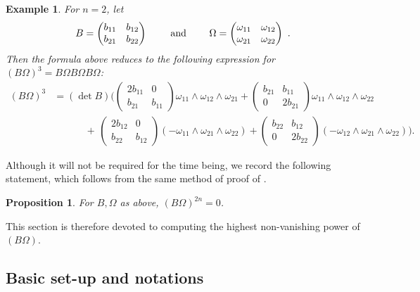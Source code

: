 \documentclass[10pt]{amsart}
\theoremstyle{plain}
\newtheorem{prop}[thm]{Proposition}
\newtheorem{ex}[thm]{Example}
\newcommand{\0}{\color{blue}{\mathsf{0}}}
\begin{document}
\begin{ex}  \label{ex:Bomeganis2} For $n=2$, let 
\[ B  = \begin{pmatrix} b_{11} & b_{12} \\ b_{21} & b_{22} \end{pmatrix} 
\qquad \hbox{ and } \qquad   \Omega=   \begin{pmatrix} \omega_{11} & \omega_{12} \\ \omega_{21} & \omega_{22} \end{pmatrix} \ . \] 
Then the formula above reduces to  the following expression for $(B\Omega)^3 = B \Omega B \Omega B \Omega$:
 \begin{align*}
(B\Omega)^3 &= (\det B) \Bigg(\left(\begin{array}{cc}2b_{11}&0\\b_{21}&b_{11}\end{array}\right)
\omega_{11}\wedge\omega_{12}\wedge\omega_{21}
+\left(\begin{array}{cc}b_{21}&b_{11}\\0&2b_{21}
\end{array}\right)
\omega_{11}\wedge\omega_{12}\wedge\omega_{22}\\
&\qquad\quad\,+\,\left(\begin{array}{cc}2b_{12}&0\\b_{22}&b_{12}\end{array}\right)
(-\omega_{11}\wedge\omega_{21}\wedge\omega_{22})
+\left(\begin{array}{cc}b_{22}&b_{12}\\0&2b_{22}\end{array}\right)
(-\omega_{12}\wedge\omega_{21}\wedge\omega_{22})\Bigg).
\end{align*}
\end{ex}

Although it will not be required for the time being, we record the following statement, which follows from the same method of proof of \cite[Proposition 4.5]{BrSigma}.

\begin{prop}  \label{prop: BOmega2nvanishes}
For $B, \Omega$ as above, $(B \Omega)^{2n}=0$. 
\end{prop}
This section is therefore devoted to computing the highest non-vanishing power of $(B \Omega)$. 

\subsection{Basic set-up and notations}  \label{sec: BOmeganotations}
\end{document}
